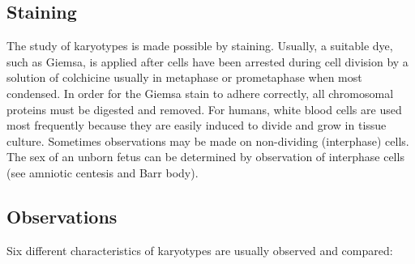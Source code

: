 \documentclass[]{book}
\theoremstyle{definition}
\theoremstyle{definition}
\theoremstyle{definition}
\theoremstyle{remark}
\begin{document}
\subsection{Staining}\label{staining}

The study of karyotypes is made possible by staining. Usually, a
suitable dye, such as Giemsa, is applied after cells have been arrested
during cell division by a solution of colchicine usually in metaphase or
prometaphase when most condensed. In order for the Giemsa stain to
adhere correctly, all chromosomal proteins must be digested and removed.
For humans, white blood cells are used most frequently because they are
easily induced to divide and grow in tissue culture. Sometimes
observations may be made on non-dividing (interphase) cells. The sex of
an unborn fetus can be determined by observation of interphase cells
(see amniotic centesis and Barr body).

\subsection{Observations}\label{observations}

Six different characteristics of karyotypes are usually observed and
compared:
\end{document}
